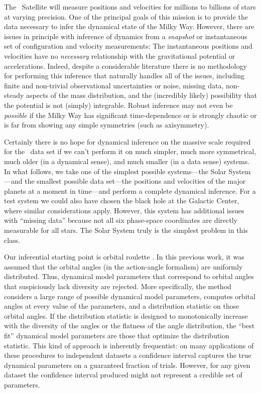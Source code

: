 The \Gaia~Satellite \citep{2001A&A...369..339P} will measure positions
and velocities for millions to billions of stars at varying precision.
One of the principal goals of this mission is to provide the data
necessary to infer the dynamical state of the Milky Way.  However,
there are issues in principle with inference of dynamics from a
\emph{snapshot} or instantaneous set of configuration and velocity
measurements: The instantaneous positions and velocities have no
\emph{necessary} relationship with the gravitational potential or
accelerations.  Indeed, despite a considerable literature \citep[for
  example,][]{Oort32, Schwarzschild79, Little87a, Binney94,
  Johnston99, roulette} there is no methodology for performing this
inference that naturally handles all of the issues, including finite
and non-trivial observational uncertainties or noise, missing data,
non-steady aspects of the mass distribution, and the (incredibly
likely) possibility that the potential is not (simply) integrable.
Robust inference may not even be \emph{possible} if the Milky Way has
significant time-dependence or is strongly chaotic or is far from
showing any simple symmetries (such as axisymmetry).

Certainly there is no hope for dynamical inference on the massive
scale required for the \Gaia\ data set if we can't perform it on much
simpler, much more symmetrical, much older (in a dynamical sense), and
much smaller (in a data sense) systems.  In what follows, we take one
of the simplest possible systems---the Solar System---and the smallest
possible data set---the positions and velocities of the major planets at a
moment in time---and perform a complete dynamical inference.  For a
test system we could also have chosen the black hole at the Galactic
Center, where similar considerations apply.  However, this system has
additional issues with ``missing data'' because not all six
phase-space coordinates are directly measurable for all stars.  The
Solar System truly is the simplest problem in this class.

Our inferential starting point is orbital roulette \citep{roulette}.
In this previous work, it was assumed that the orbital angles (in the
action-angle formalism) are uniformly distributed. Thus, dynamical
model parameters that correspond to orbital angles that suspiciously
lack diversity are rejected. More specifically, the method considers a
large range of possible dynamical model parameters, computes orbital
angles at every value of the parameters, and a distribution statistic
on those orbital angles. If the distribution statistic is designed to
monotonically increase with the diversity of the angles or the
flatness of the angle distribution, the ``best fit'' dynamical model
parameters are those that optimize the distribution statistic.  This
kind of approach is inherently frequentist: on many applications of
these procedures to independent datasets a confidence interval
captures the true dynamical parameters on a guaranteed fraction of
trials. However, for any given dataset the confidence interval
produced might not represent a credible set of parameters.

